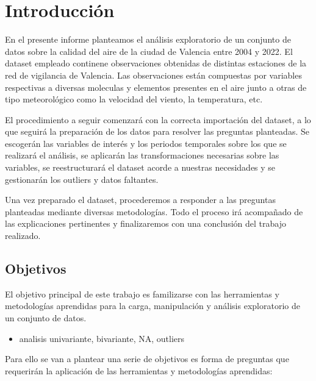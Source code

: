 \documentclass[notspecified,article,submit,moreauthors,pdftex]{Definitions/mdpi}
\providecommand{\tightlist}{%
  \setlength{\itemsep}{0pt}\setlength{\parskip}{0pt}}
\begin{document}

\hypertarget{introducciuxf3n}{%
\section{Introducción}\label{introducciuxf3n}}

En el presente informe planteamos el análisis exploratorio de un
conjunto de datos sobre la calidad del aire de la ciudad de Valencia
entre 2004 y 2022. El dataset empleado continene observaciones obtenidas
de distintas estaciones de la red de vigilancia de Valencia. Las
observaciones están compuestas por variables respectivas a diversas
moleculas y elementos presentes en el aire junto a otras de tipo
meteorológico como la velocidad del viento, la temperatura, etc.

El procedimiento a seguir comenzará con la correcta importación del
dataset, a lo que seguirá la preparación de los datos para resolver las
preguntas planteadas. Se escogerán las variables de interés y los
periodos temporales sobre los que se realizará el análisis, se aplicarán
las transformaciones necesarias sobre las variables, se reestructurará
el dataset acorde a nuestras necesidades y se gestionarán los outliers y
datos faltantes.

Una vez preparado el dataset, procederemos a responder a las preguntas
planteadas mediante diversas metodologías. Todo el proceso irá
acompañado de las explicaciones pertinentes y finalizaremos con una
conclusión del trabajo realizado.

\hypertarget{objetivos}{%
\subsection{Objetivos}\label{objetivos}}

El objetivo principal de este trabajo es familizarse con las
herramientas y metodologías aprendidas para la carga, manipulación y
análisis exploratorio de un conjunto de datos.

\begin{itemize}
\tightlist
\item
  analisis univariante, bivariante, NA, outliers
\end{itemize}

Para ello se van a plantear una serie de objetivos es forma de preguntas
que requerirán la aplicación de las herramientas y metodologías
aprendidas:
\end{document}
